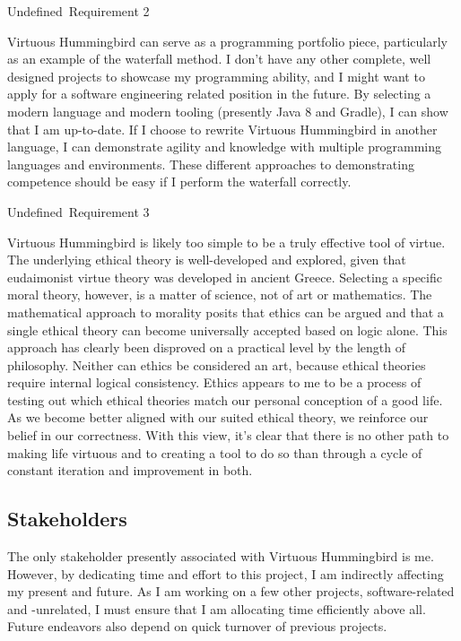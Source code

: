 \documentclass{article}
\newcommand{\requirementname}{Undefined}
\newcommand{\requirementlabel}{undefined}
\newenvironment{requirement}[1]
    {
        \begin{mdframed}
        \label{\requirementlabel-#1}
        \vspace{2.5mm}
        \begin{center}
            {\large \requirementname\ Requirement #1}
        \end{center}
        \vspace{2.5mm}
    }
    {
        \end{mdframed}
    }
\begin{document}
\begin{requirement}{2}
    Virtuous Hummingbird can serve as a programming portfolio piece, particularly as an example of the waterfall method.
    I don't have any other complete, well designed projects to showcase my programming ability, and I might want to apply for a software engineering related position in the future.
    By selecting a modern language and modern tooling (presently Java 8 and Gradle), I can show that I am up-to-date.
    If I choose to rewrite Virtuous Hummingbird in another language, I can demonstrate agility and knowledge with multiple programming languages and environments.
    These different approaches to demonstrating competence should be easy if I perform the waterfall correctly.
\end{requirement}
 
\begin{requirement}{3}
    Virtuous Hummingbird is likely too simple to be a truly effective tool of virtue.
    The underlying ethical theory is well-developed and explored, given that eudaimonist virtue theory was developed in ancient Greece.
    Selecting a specific moral theory, however, is a matter of science, not of art or mathematics.
    The mathematical approach to morality posits that ethics can be argued and that a single ethical theory can become universally accepted based on logic alone.
    This approach has clearly been disproved on a practical level by the length of philosophy.
    Neither can ethics be considered an art, because ethical theories require internal logical consistency.
    Ethics appears to me to be a process of testing out which ethical theories match our personal conception of a good life.
    As we become better aligned with our suited ethical theory, we reinforce our belief in our correctness.
    With this view, it's clear that there is no other path to making life virtuous and to creating a tool to do so than through a cycle of constant iteration and improvement in both.
\end{requirement}

\subsection{Stakeholders}

The only stakeholder presently associated with Virtuous Hummingbird is me.
However, by dedicating time and effort to this project, I am indirectly affecting my present and future.
As I am working on a few other projects, software-related and -unrelated, I must ensure that I am allocating time efficiently above all.
Future endeavors also depend on quick turnover of previous projects.
\end{document}
